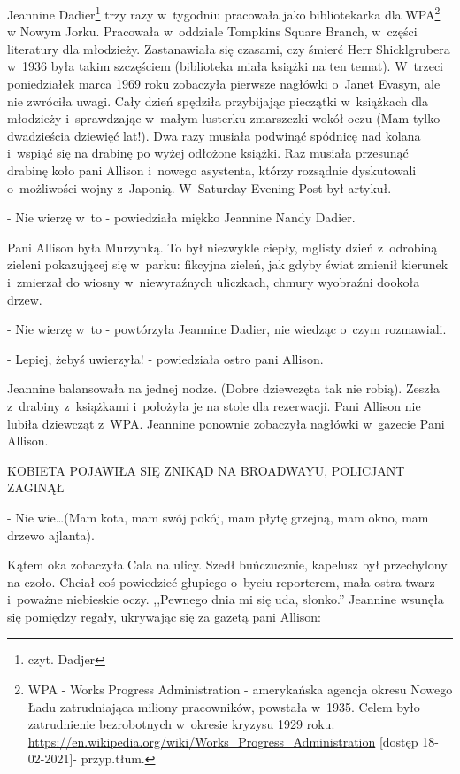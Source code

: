 \documentclass[oneside,polish,12pt,sfheadings]{mwbk}
\begin{document}
Jeannine Dadier\footnote{czyt. Dadjer} trzy razy w~tygodniu pracowała jako
bibliotekarka dla WPA\footnote{WPA - Works Progress Administration - amerykańska agencja okresu Nowego Ładu zatrudniająca miliony pracowników, powstała w~1935. Celem było zatrudnienie bezrobotnych w~okresie kryzysu 1929 roku. \url{https://en.wikipedia.org/wiki/Works_Progress_Administration} [dostęp 18-02-2021]- przyp.tłum.} w Nowym Jorku. Pracowała w~oddziale Tompkins Square Branch, w~części literatury dla młodzieży. Zastanawiała się czasami, czy śmierć Herr Shicklgrubera w~1936 była takim szczęściem (biblioteka miała książki na ten temat). W~trzeci poniedziałek marca 1969 roku zobaczyła pierwsze nagłówki o~Janet Evasyn, ale nie zwróciła uwagi. Cały dzień spędziła przybijając pieczątki w~książkach dla młodzieży i~sprawdzając w~małym lusterku zmarszczki wokół oczu (Mam tylko dwadzieścia dziewięć lat!). Dwa razy musiała podwinąć spódnicę nad kolana i~wspiąć się na drabinę po wyżej odłożone książki. Raz musiała przesunąć drabinę koło pani Allison i~nowego asystenta, którzy rozsądnie dyskutowali o~możliwości wojny z~Japonią. W~Saturday Evening Post był artykuł.

- Nie wierzę w~to - powiedziała miękko Jeannine Nandy Dadier. 

Pani Allison była Murzynką. To był niezwykle ciepły, mglisty dzień z~odrobiną
zieleni pokazującej się w~parku: fikcyjna zieleń, jak gdyby świat
zmienił kierunek i~zmierzał do wiosny w~niewyraźnych uliczkach, chmury
wyobraźni dookoła drzew.

- Nie wierzę w~to - powtórzyła Jeannine Dadier, nie wiedząc o~czym
rozmawiali. 

- Lepiej, żebyś uwierzyła! - powiedziała ostro pani Allison.

Jeannine balansowała na jednej nodze. (Dobre dziewczęta tak nie robią).
Zeszła z~drabiny z~książkami i~położyła je na stole dla rezerwacji.
Pani Allison nie lubiła dziewcząt z~WPA. Jeannine ponownie zobaczyła
nagłówki w~gazecie Pani Allison.

KOBIETA POJAWIŁA SIĘ ZNIKĄD NA BROADWAYU, POLICJANT ZAGINĄŁ 

- Nie wie\ldots (Mam kota, mam swój pokój, mam płytę grzejną, mam okno, mam
drzewo ajlanta).

Kątem oka zobaczyła Cala na ulicy. Szedł buńczucznie, kapelusz był
przechylony na czoło. Chciał coś powiedzieć głupiego o~byciu reporterem,
mała ostra twarz i~poważne niebieskie oczy. ,,Pewnego dnia mi się
uda, słonko.'' Jeannine wsunęła się pomiędzy regały, ukrywając się
za gazetą pani Allison: 
\end{document}
